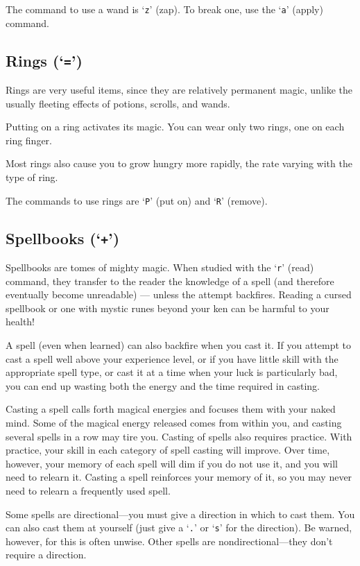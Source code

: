 The command to use a wand is `{\tt z}' (zap).  To break one, use the `{\tt a}' (apply)
command.
\subsection*{Rings (`{\tt =}')}


Rings are very useful items, since they are relatively permanent
magic, unlike the usually fleeting effects of potions, scrolls, and
wands.

Putting on a ring activates its magic.  You can wear only two
rings, one on each ring finger.

Most rings also cause you to grow hungry more rapidly, the rate
varying with the type of ring.  

The commands to use rings are `{\tt P}' (put on) and `{\tt R}' (remove).
\subsection*{Spellbooks (`{\tt +}')}


Spellbooks are tomes of mighty magic.  When studied with the `{\tt r}' (read)
command, they transfer to the reader the knowledge of a spell (and
therefore eventually become unreadable) --- unless the attempt backfires.
Reading a cursed spellbook or one with mystic runes beyond
your ken can be harmful to your health!

A spell (even when learned) can also backfire when you cast it.  If you
attempt to cast a spell well above your experience level, or if you have
little skill with the appropriate spell type, or cast it at
a time when your luck is particularly bad, you can end up wasting both the
energy and the time required in casting.

Casting a spell calls forth magical energies and focuses them with
your naked mind.  Some of the magical energy released comes from within
you, and casting several spells in a row may tire you.
Casting of spells also requires practice.  With practice, your
skill in each category of spell casting will improve.  Over time, however,
your memory of each spell will dim if you do not use it, and you will need 
to relearn it. Casting a spell reinforces your memory of it, so you may
never need to relearn a frequently used spell.

Some spells are
directional---you must give a direction in which to cast them.  You can also
cast them at yourself (just give a `{\tt .}' or `{\tt s}' for the direction). Be warned,
however, for this is often unwise.  Other spells are nondirectional---they
don't require a direction.

